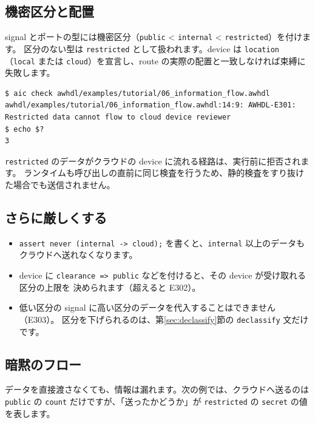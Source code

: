 \documentclass[a4paper,11pt]{ltjsarticle}
\newcommand{\ex}[1]{\texttt{examples/tutorial/#1}}
\begin{document}
\subsection{機密区分と配置}

signal とポートの型には機密区分（\texttt{public} < \texttt{internal} < \texttt{restricted}）を付けます。
区分のない型は \texttt{restricted} として扱われます。device は \texttt{location}
（\texttt{local} または \texttt{cloud}）を宣言し、route の実際の配置と一致しなければ束縛に失敗します。



\begin{lstlisting}[style=shell]
$ aic check awhdl/examples/tutorial/06_information_flow.awhdl
awhdl/examples/tutorial/06_information_flow.awhdl:14:9: AWHDL-E301: Restricted data cannot flow to cloud device reviewer
$ echo $?
3
\end{lstlisting}

\texttt{restricted} のデータがクラウドの device に流れる経路は、実行前に拒否されます。
ランタイムも呼び出しの直前に同じ検査を行うため、静的検査をすり抜けた場合でも送信されません。

\subsection{さらに厳しくする}

\begin{itemize}
  \item \texttt{assert never (internal -> cloud);} を書くと、\texttt{internal} 以上のデータも
        クラウドへ送れなくなります。
  \item device に \texttt{clearance => public} などを付けると、その device が受け取れる区分の上限を
        決められます（超えると E302）。
  \item 低い区分の signal に高い区分のデータを代入することはできません（E303）。
        区分を下げられるのは、第\ref{sec:declassify}節の \texttt{declassify} 文だけです。
\end{itemize}

\subsection{暗黙のフロー}

データを直接渡さなくても、情報は漏れます。次の例では、クラウドへ送るのは \texttt{public} の
\texttt{count} だけですが、「送ったかどうか」が \texttt{restricted} の \texttt{secret} の値を表します。
\end{document}
